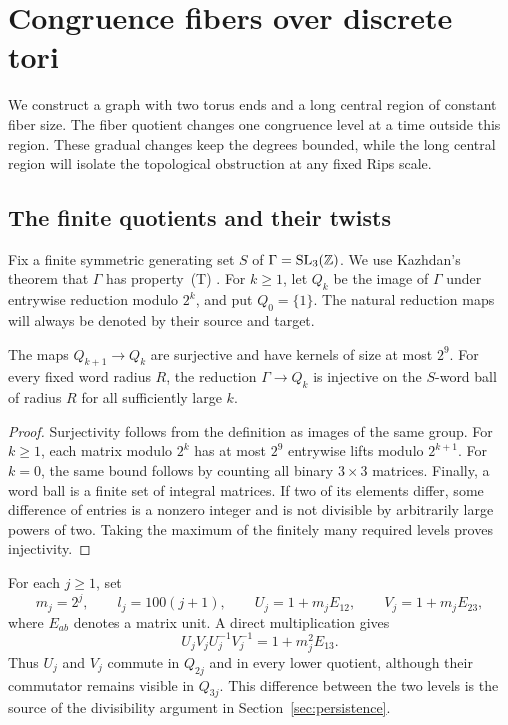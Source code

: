 \section{Congruence fibers over discrete tori}\label{sec:geometry}

We construct a graph with two torus ends and a long central region of constant
fiber size. The fiber quotient changes one congruence level at a time outside
this region. These gradual changes keep the degrees bounded, while the long
central region will isolate the topological obstruction at any fixed Rips
scale.

\subsection{The finite quotients and their twists}

Fix a finite symmetric generating set $S$ of
$\Gamma=\operatorname{SL}_3(\mathbb Z)$. We use Kazhdan's theorem that $\Gamma$ has property~(T)
\cite{Kazhdan67,BHV08}. For $k\geq 1$, let $Q_k$ be the image of $\Gamma$
under entrywise reduction modulo $2^k$, and put $Q_0=\{1\}$. The natural
reduction maps will always be denoted by their source and target.

\begin{lemma}\label{geom:quotients}
The maps $Q_{k+1}\to Q_k$ are surjective and have kernels of size at most
$2^9$. For every fixed word radius $R$, the reduction $\Gamma\to Q_k$ is
injective on the $S$-word ball of radius $R$ for all sufficiently large $k$.
\end{lemma}

\begin{proof}
Surjectivity follows from the definition as images of the same group. For
$k\geq1$, each matrix modulo $2^k$ has at most $2^9$ entrywise lifts modulo
$2^{k+1}$. For $k=0$, the same bound follows by counting all binary
$3\times3$ matrices. Finally, a word ball is a finite set of integral
matrices. If two of its elements differ, some difference of entries is a
nonzero integer and is not divisible by arbitrarily large powers of two.
Taking the maximum of the finitely many required levels proves injectivity.
\end{proof}

For each $j\geq1$, set
\begin{equation}\label{geom:parameters}
 m_j=2^j,\qquad l_j=100(j+1),\qquad
 U_j=1+m_jE_{12},\qquad V_j=1+m_jE_{23},
\end{equation}
where $E_{ab}$ denotes a matrix unit. A direct multiplication gives
\begin{equation}\label{geom:commutator}
 U_jV_jU_j^{-1}V_j^{-1}=1+m_j^2E_{13}.
\end{equation}
Thus $U_j$ and $V_j$ commute in $Q_{2j}$ and in every lower quotient, although
their commutator remains visible in $Q_{3j}$. This difference between the two
levels is the source of the divisibility argument in
Section~\ref{sec:persistence}.

